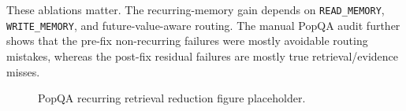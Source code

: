 These ablations matter. The recurring-memory gain depends on \texttt{READ\_MEMORY}, \texttt{WRITE\_MEMORY}, and future-value-aware routing. The manual PopQA audit further shows that the pre-fix non-recurring failures were mostly avoidable routing mistakes, whereas the post-fix residual failures are mostly true retrieval/evidence misses.

\begin{figure}[t]
\centering
{}
\caption{PopQA recurring retrieval reduction figure placeholder.}
\end{figure}
